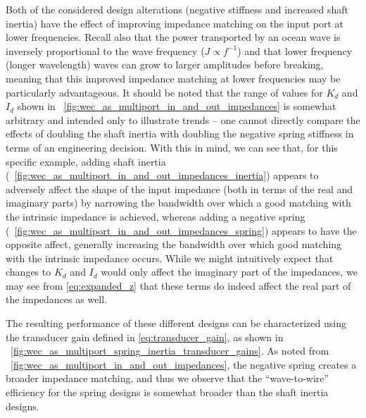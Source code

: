 \documentclass[lettersize,journal]{IEEEtran}
\begin{document}
Both of the considered design alterations (negative stiffness and increased shaft inertia) have the effect of improving impedance matching on the input port at lower frequencies.
Recall also that the power transported by an ocean wave is inversely proportional to the wave frequency ($J \propto f^{-1}$) and that lower frequency (longer wavelength) waves can grow to larger amplitudes before breaking, meaning that this improved impedance matching at lower frequencies may be particularly advantageous.
It should be noted that the range of values for $K_d$ and $I_d$ shown in \figurename~\ref{fig:wec_as_multiport_in_and_out_impedances} is somewhat arbitrary and intended only to illustrate trends -- one cannot directly compare the effects of doubling the shaft inertia with doubling the negative spring stiffness in terms of an engineering decision.
With this in mind, we can see that, for this specific example, adding shaft inertia (\figurename~\ref{fig:wec_as_multiport_in_and_out_impedances_inertia}) appears to adversely affect the shape of the input impedance (both in terms of the real and imaginary parts) by narrowing the bandwidth over which a good matching with the intrinsic impedance is achieved, whereas adding a negative spring (\figurename~\ref{fig:wec_as_multiport_in_and_out_impedances_spring}) appears to have the opposite affect, generally increasing the bandwidth over which good matching with the intrinsic impedance occurs.
While we might intuitively expect that changes to $K_d$ and $I_d$ would only affect the imaginary part of the impedances, we may see from \eqref{eq:expanded_z} that these terms do indeed affect the real part of the impedances as well.

The resulting performance of these different designs can be characterized using the transducer gain defined in \eqref{eq:transducer_gain}, as shown in \figurename~\ref{fig:wec_as_multiport_spring_inertia_transducer_gains}.
As noted from \figurename~\ref{fig:wec_as_multiport_in_and_out_impedances}, the negative spring creates a broader impedance matching, and thus we observe that the ``wave-to-wire'' efficiency for the spring designs is somewhat broader than the shaft inertia designs.
\end{document}
